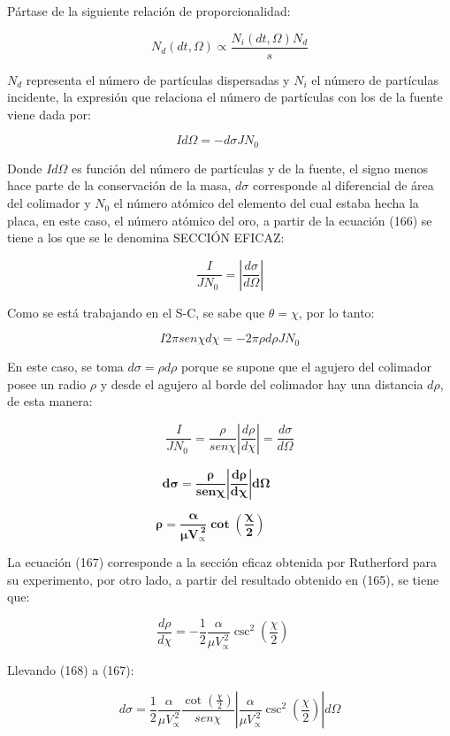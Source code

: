 \documentclass[]{article}
\begin{document}
Pártase de la siguiente relación de proporcionalidad:

\[N_{d}(dt,\Omega) \propto \frac{N_{i}(dt,\Omega)N_{d}}{s}\]

\(N_{d}\) representa el número de partículas dispersadas y \(N_{i}\) el
número de partículas incidente, la expresión que relaciona el número de
partículas con los de la fuente viene dada por:

\[Id\Omega = - d\sigma JN_{0}\ \ \ \ \ \ \ \ \ \]

Donde \(Id\Omega\) es función del número de partículas y de la fuente,
el signo menos hace parte de la conservación de la masa, \(d\sigma\)
corresponde al diferencial de área del colimador y \(N_{0}\) el número
atómico del elemento del cual estaba hecha la placa, en este caso, el
número atómico del oro, a partir de la ecuación (166) se tiene a los que
se le denomina SECCIÓN EFICAZ:

\[\frac{I}{JN_{0}\ } = \left| \frac{d\sigma}{d\Omega} \right|\]

Como se está trabajando en el S-C, se sabe que \(\theta = \chi\), por lo
tanto:

\[I2\pi{sen}\chi d\chi = - 2\pi\rho d\rho JN_{0}\]

En este caso, se toma \(d\sigma = \rho d\rho\) porque se supone que el
agujero del colimador posee un radio \(\rho\) y desde el agujero al
borde del colimador hay una distancia \(d\rho\), de esta manera:

\[\frac{I}{JN_{0}\ } = \frac{\rho}{{sen}\chi}\left| \frac{d\rho}{d\chi} \right| = \frac{d\sigma}{d\Omega}\]

\[\mathbf{d\sigma =}\frac{\mathbf{\rho}}{\mathbf{sen}\mathbf{\chi}}\left| \frac{\mathbf{d\rho}}{\mathbf{d\chi}} \right|\mathbf{d}\mathbf{\Omega}\mathbf{\ \ \ \ \ \ \ \ \ \ }\]

\[\mathbf{\rho =}\frac{\mathbf{\alpha}}{\mathbf{\mu}\mathbf{V}_{\mathbf{\propto}}^{\mathbf{\ 2}}}\mathbf{\cot}\left( \frac{\mathbf{\chi}}{\mathbf{2}} \right)\mathbf{\ \ \ \ \ \ \ \ \ \ \ \ \ \ }\]

La ecuación (167) corresponde a la sección eficaz obtenida por
Rutherford para su experimento, por otro lado, a partir del resultado
obtenido en (165), se tiene que:

\[\frac{d\rho}{d\chi} = - \frac{1}{2}\frac{\alpha}{\mu V_{\propto}^{\ 2}}\csc^{2}\left( \frac{\chi}{2} \right)\ \ \ \ \ \]

Llevando (168) a (167):

\[d\sigma = \frac{1}{2}\frac{\alpha}{\mu V_{\propto}^{\ 2}}\frac{\cot\left( \frac{\chi}{2} \right)}{{sen}\chi}\left| \frac{\alpha}{\mu V_{\propto}^{\ 2}}\csc^{2}\left( \frac{\chi}{2} \right) \right|d\Omega\]
\end{document}
